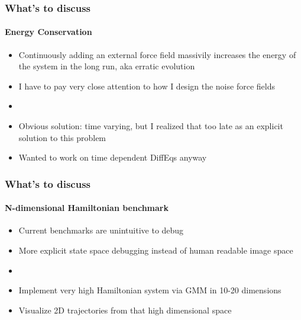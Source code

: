\documentclass[usenames, dvipsnames, t]{beamer}
\begin{document}
\begin{frame}
	\frametitle{What's to discuss}
	\framesubtitle{Energy Conservation}
	\begin{itemize}
		\item Continuously adding an external force field massivily increases the energy of the system in the long run, aka erratic evolution
		\item I have to pay very close attention to how I design the noise force fields
		\item []
		\item Obvious solution: time varying, but I realized that too late as an explicit solution to this problem
		\item Wanted to work on time dependent DiffEqs anyway
	\end{itemize}
\end{frame}

\begin{frame}
	\frametitle{What's to discuss}
	\framesubtitle{N-dimensional Hamiltonian benchmark}
	\begin{itemize}
		\item Current benchmarks are unintuitive to debug
		\item More explicit state space debugging instead of human readable image space
		\item []
		\item Implement very high Hamiltonian system via GMM in 10-20 dimensions
		\item Visualize 2D trajectories from that high dimensional space
	\end{itemize}
\end{frame}
\end{document}
